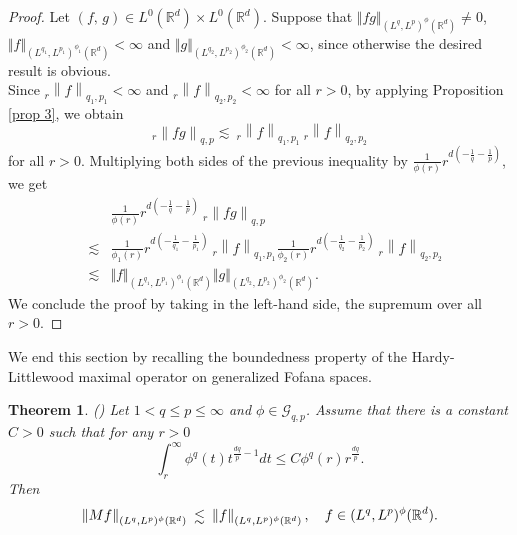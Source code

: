 \documentclass[10pt,a4paper]{amsart}
\numberwithin{equation}{section}
\newtheorem{theorem}{Theorem}[section]
\numberwithin{equation}{section}
\def\lsim{\raisebox{-1ex}{$~\stackrel{\textstyle <}{\sim}~$}}
\begin{document}
\begin{proof}
Let $(f,\,g) \in L^{0} (\mathbb{R}^{d})\times L^{0} (\mathbb{R}^{d})$. Suppose that $\Vert f g\Vert_{(L^{q},L^{p})^{\phi}(\mathbb{R}^{d})} \neq 0$, $\Vert f \Vert_{(L^{q_{1}},L^{p_{1}})^{\phi_{1}}(\mathbb{R}^{d}) } < \infty$ and  $ \Vert g \Vert_{(L^{q_{2}},L^{p_{2}})^{\phi_{2}}(\mathbb{R}^{d})}< \infty$, since otherwise the desired result is obvious.\\ Since $_{r}\left\|f\right\|_{q_{1},p_{1}}<\infty$ and $_{r}\left\|f\right\|_{q_{2},p_{2}}< \infty$ for all $r>0$, by applying Proposition \ref{prop 3}, we obtain 
\begin{equation*}
    _{r}\left\|fg\right\|_{q,p} \lesssim \: _{r}\left\|f\right\|_{q_{1},p_{1}} \: _{r}\left\|f\right\|_{q_{2},p_{2}}
\end{equation*}
for all $r>0$. Multiplying both sides of the previous inequality by
$\frac{1}{\phi(r)}r^{d(-\frac{1}{q}-\frac{1}{p})}$, we get 
\begin{eqnarray*}
&&\frac{1}{\phi(r)}r^{d(-\frac{1}{q}-\frac{1}{p})}\: _{r}\left\|fg\right\|_{q,p} \\ & \lesssim &  \frac{1}{\phi_{1}(r)}r^{d(-\frac{1}{q_{1}}-\frac{1}{p_{1}})}\:_{r}\left\|f\right\|_{q_{1},p_{1}} \frac{1}{\phi_{2}(r)}r^{d(-\frac{1}{q_{2}}-\frac{1}{p_{2}})}\: _{r}\left\|f\right\|_{q_{2},p_{2}}\\
& \lesssim & \Vert f \Vert_{(L^{q_{1}},L^{p_{1}})^{\phi_{1}}(\mathbb{R}^{d}) } \Vert g \Vert_{(L^{q_{2}},L^{p_{2}})^{\phi_{2}}(\mathbb{R}^{d})}.
\end{eqnarray*}
We conclude the proof by taking in the left-hand side, the supremum  over all $r>0$.
\end{proof}
We end this section by recalling the boundedness property of the Hardy-Littlewood maximal operator on generalized Fofana spaces.
\begin{theorem}(\cite[Theorem 3.1]{NKD})
\label{theo 1}
 Let $1 < q\leq p \leq \infty$ and $\phi\in \mathcal{G}_{q,p}$. Assume that there is a constant $ C > 0 $ such that for any $ r >0 $  
  \begin{equation}\label{eqq 2}
 \displaystyle\int_{r}^{\infty} \phi^{q}(t)t^{\frac{dq}{p}-1} dt \leq C   \phi^{q}(r)r^{\frac{dq}{p}}.
  \end{equation}
  Then $$\left\Vert Mf \right\Vert_{(L^{q},L^{p})^{\phi}(\mathbb{R}^{d})} \lsim  \left\Vert f  \right\Vert_{(L^{q},L^{p})^{\phi}(\mathbb{R}^{d})}, \quad f \in (L^{q},L^{p})^{\phi}(\mathbb{R}^{d}).$$
\end{theorem}
\end{document}
